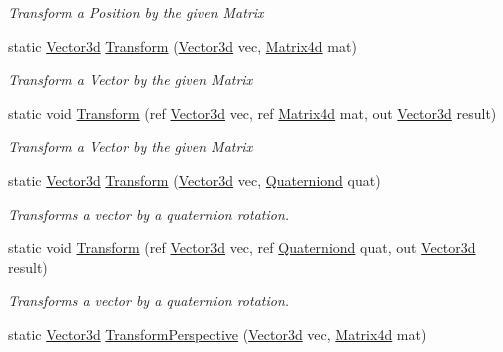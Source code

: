\begin{DoxyCompactItemize}
\begin{DoxyCompactList}\small\item\em Transform a Position by the given Matrix\end{DoxyCompactList}\item 
static \hyperlink{struct_open_t_k_1_1_vector3d}{Vector3d} \hyperlink{struct_open_t_k_1_1_vector3d_af14d87cf6330c7381b3773cd165032a2}{Transform} (\hyperlink{struct_open_t_k_1_1_vector3d}{Vector3d} vec, \hyperlink{struct_open_t_k_1_1_matrix4d}{Matrix4d} mat)
\begin{DoxyCompactList}\small\item\em Transform a Vector by the given Matrix\end{DoxyCompactList}\item 
static void \hyperlink{struct_open_t_k_1_1_vector3d_ac001fabab6214fa4d83aebf9f766eeb2}{Transform} (ref \hyperlink{struct_open_t_k_1_1_vector3d}{Vector3d} vec, ref \hyperlink{struct_open_t_k_1_1_matrix4d}{Matrix4d} mat, out \hyperlink{struct_open_t_k_1_1_vector3d}{Vector3d} result)
\begin{DoxyCompactList}\small\item\em Transform a Vector by the given Matrix\end{DoxyCompactList}\item 
static \hyperlink{struct_open_t_k_1_1_vector3d}{Vector3d} \hyperlink{struct_open_t_k_1_1_vector3d_a9c8b5c060958dd56893fe5a6cf21245d}{Transform} (\hyperlink{struct_open_t_k_1_1_vector3d}{Vector3d} vec, \hyperlink{struct_open_t_k_1_1_quaterniond}{Quaterniond} quat)
\begin{DoxyCompactList}\small\item\em Transforms a vector by a quaternion rotation. \end{DoxyCompactList}\item 
static void \hyperlink{struct_open_t_k_1_1_vector3d_a5db7b54819e762a9cd16db732e4846fe}{Transform} (ref \hyperlink{struct_open_t_k_1_1_vector3d}{Vector3d} vec, ref \hyperlink{struct_open_t_k_1_1_quaterniond}{Quaterniond} quat, out \hyperlink{struct_open_t_k_1_1_vector3d}{Vector3d} result)
\begin{DoxyCompactList}\small\item\em Transforms a vector by a quaternion rotation. \end{DoxyCompactList}\item 
static \hyperlink{struct_open_t_k_1_1_vector3d}{Vector3d} \hyperlink{struct_open_t_k_1_1_vector3d_aa776e9fd6b0881d20814397a155e1341}{Transform\-Perspective} (\hyperlink{struct_open_t_k_1_1_vector3d}{Vector3d} vec, \hyperlink{struct_open_t_k_1_1_matrix4d}{Matrix4d} mat)

\end{DoxyCompactItemize}
